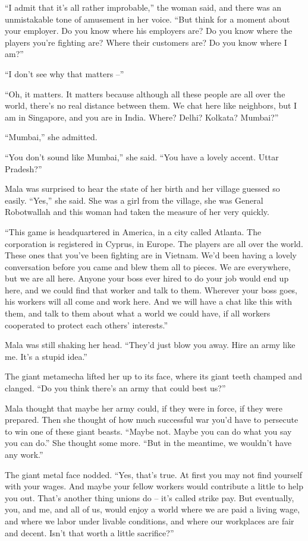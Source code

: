 ``I admit that it's all rather improbable,'' the woman said, and
there was an unmistakable tone of amusement in her voice. ``But
think for a moment about your employer. Do you know where his
employers are? Do you know where the players you're fighting are?
Where their customers are? Do you know where I am?''

``I don't see why that matters --''

``Oh, it matters. It matters because although all these people are
all over the world, there's no real distance between them. We chat
here like neighbors, but I am in Singapore, and you are in India.
Where? Delhi? Kolkata? Mumbai?''

``Mumbai,'' she admitted.

``You don't sound like Mumbai,'' she said. ``You have a lovely accent.
Uttar Pradesh?''

Mala was surprised to hear the state of her birth and her village
guessed so easily. ``Yes,'' she said. She was a girl from the
village, she was General Robotwallah and this woman had taken the
measure of her very quickly.

``This game is headquartered in America, in a city called Atlanta.
The corporation is registered in Cyprus, in Europe. The players are
all over the world. These ones that you've been fighting are in
Vietnam. We'd been having a lovely conversation before you came and
blew them all to pieces. We are everywhere, but we are all here.
Anyone your boss ever hired to do your job would end up here, and
we could find that worker and talk to them. Wherever your boss
goes, his workers will all come and work here. And we will have a
chat like this with them, and talk to them about what a world we
could have, if all workers cooperated to protect each others'
interests.''

Mala was still shaking her head. ``They'd just blow you away. Hire
an army like me. It's a stupid idea.''

The giant metamecha lifted her up to its face, where its giant
teeth champed and clanged. ``Do you think there's an army that could
best us?''

Mala thought that maybe her army could, if they were in force, if
they were prepared. Then she thought of how much successful war
you'd have to persecute to win one of these giant beasts. ``Maybe
not. Maybe you can do what you say you can do.'' She thought some
more. ``But in the meantime, we wouldn't have any work.''

The giant metal face nodded. ``Yes, that's true. At first you may
not find yourself with your wages. And maybe your fellow workers
would contribute a little to help you out. That's another thing
unions do -- it's called strike pay. But eventually, you, and me,
and all of us, would enjoy a world where we are paid a living wage,
and where we labor under livable conditions, and where our
workplaces are fair and decent. Isn't that worth a little
sacrifice?''

